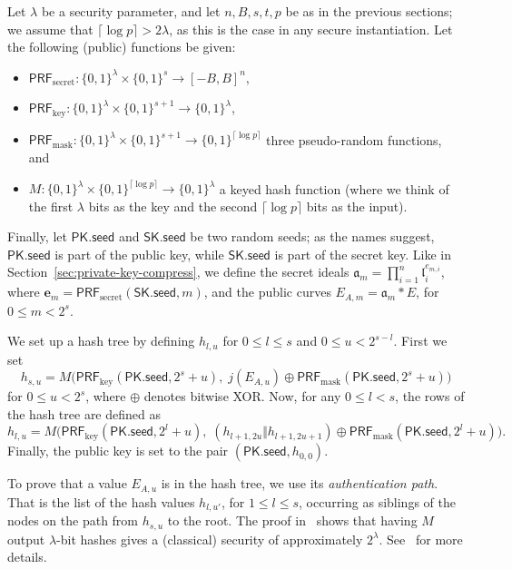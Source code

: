 \documentclass{llncs}
\newcommand{\seed}{\mathsf{seed}}
\newcommand{\PK}{\mathsf{PK}}
\newcommand{\SK}{\mathsf{SK}}
\renewcommand{\a}{\mathfrak{a}}
\renewcommand{\l}{\mathfrak{l}}
\newcommand{\e}{\mathbf{e}}
\newcommand{\PRF}{\mathsf{PRF}}
\newcommand{\PRFk}{\PRF_{\mathrm{key}}}
\newcommand{\PRFm}{\PRF_{\mathrm{mask}}}
\newcommand{\PRFs}{\PRF_{\mathrm{secret}}}
\begin{document}
Let $\lambda$ be a security parameter, and let $n,B,s,t,p$ be as in the previous sections; we assume that $\lceil\log p\rceil > 2\lambda$, as this is the case in any secure instantiation.
Let the following (public) functions be given:

\begin{itemize}
\item $\PRFs: \{0,1\}^\lambda \times \{0,1\}^s \to [-B,B]^n$,
\item $\PRFk: \{0,1\}^\lambda \times \{0,1\}^{s+1} \to \{0,1\}^\lambda$,
\item $\PRFm: \{0,1\}^\lambda \times \{0,1\}^{s+1} \to \{0,1\}^{\lceil\log p\rceil}$ three pseudo-random functions, and
\item $M: \{0,1\}^\lambda \times \{0,1\}^{\lceil\log p\rceil} \to \{0,1\}^\lambda$ a keyed hash function (where we think of the first $\lambda$ bits as the key and the second $\lceil\log p\rceil$ bits as the input).
\end{itemize}

Finally, let $\PK.\seed$ and $\SK.\seed$ be two random seeds; as the names suggest, $\PK.\seed$ is part of the public key, while $\SK.\seed$ is part of the secret key.
Like in Section~\ref{sec:private-key-compress}, we define the secret ideals $\a_m = \prod_{i=1}^n \l_i^{e_{m,i}}$, where $\e_m=\PRFs(\SK.\seed, m)$, and the public curves $E_{A,m}=\a_m*E$, for $0 \le m < 2^s$.

We set up a hash tree by defining $h_{l,u}$ for $0 \le l \le s$ and $0 \le u < 2^{s-l}$.
First we set
\[h_{s,u} = M\bigl( \PRFk(\PK.\seed,2^s+u ),\; j( E_{A,u} ) \oplus \PRFm(\PK.\seed,2^s+u ) \bigr)\]
for $0 \le u < 2^s$, where $\oplus$ denotes bitwise XOR.
Now, for any $0 \le l < s$, the rows of the hash tree are defined as
\[
  h_{l,u} = M\bigl( \PRFk(\PK.\seed, 2^l+u ),\;
  (h_{l+1,2u}\Vert h_{l+1,2u+1}) \oplus \PRFm(\PK.\seed, 2^l+u) \bigr).
\]
Finally, the public key is set to the pair $(\PK.\seed, h_{0,0})$.

To prove that a value $E_{A,u}$ is in the hash tree, we use its \emph{authentication path}.
That is the list of the hash values $h_{l,u'}$, for $1\le l \le s$, occurring as siblings of the nodes on the path from $h_{s,u}$ to the root.
The proof in~\cite[Appendix~B]{10.1007/978-3-662-49384-7_15} shows that having $M$ output $\lambda$-bit hashes gives a (classical) security of approximately $2^\lambda$.
See~\cite{10.1007/978-3-662-49384-7_15,sphincs+} for more details.
\end{document}
